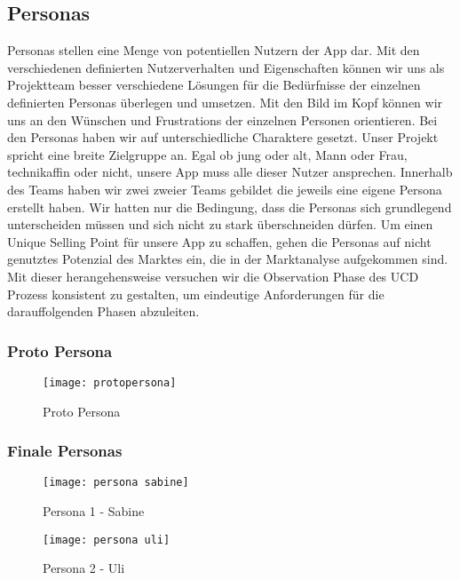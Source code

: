 \subsection{Personas}

Personas stellen eine Menge von potentiellen Nutzern der App dar. Mit den verschiedenen definierten Nutzerverhalten und Eigenschaften können wir uns als Projektteam besser verschiedene Lösungen für die Bedürfnisse der einzelnen definierten Personas überlegen und umsetzen. Mit den Bild im Kopf können wir uns an den Wünschen und Frustrations der einzelnen Personen orientieren. Bei den Personas haben wir auf unterschiedliche Charaktere gesetzt. Unser Projekt spricht eine breite Zielgruppe an. Egal ob jung oder alt, Mann oder Frau, technikaffin oder nicht, unsere App muss alle dieser Nutzer ansprechen. Innerhalb des Teams haben wir zwei zweier Teams gebildet die jeweils eine eigene Persona erstellt haben. Wir hatten nur die Bedingung, dass die Personas sich grundlegend unterscheiden müssen und sich nicht zu stark überschneiden dürfen. Um einen Unique Selling Point für unsere App zu schaffen, gehen die Personas auf nicht genutztes Potenzial des Marktes ein, die in der Marktanalyse aufgekommen sind. Mit dieser herangehensweise versuchen wir die Observation Phase des UCD Prozess konsistent zu gestalten, um eindeutige Anforderungen für die darauffolgenden Phasen abzuleiten.

\clearpage

\subsubsection{Proto Persona}

\begin{figure}[h]
  \centering
  \texttt{[image: protopersona]}
  \caption{Proto Persona}
  \label{fig:protopersona}
\end{figure}

\clearpage

\subsubsection{Finale Personas}

\begin{figure}[H]
  \centering
  \texttt{[image: persona sabine]}
  \caption{Persona 1 - Sabine}
  \label{fig:persona-uli}
\end{figure}

\clearpage

\begin{figure}[H]
  \centering
  \texttt{[image: persona uli]}
  \caption{Persona 2 - Uli}
  \label{fig:persona-uli}
\end{figure}
